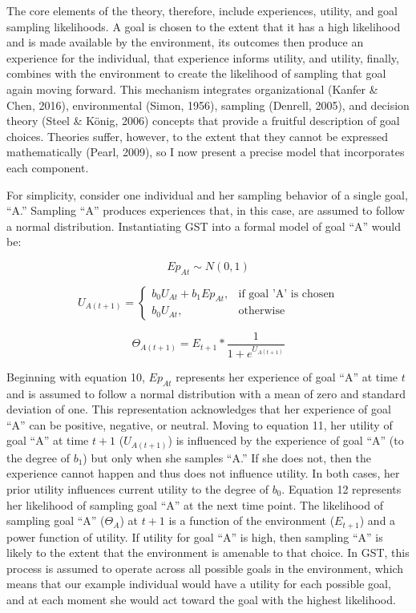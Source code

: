 \documentclass[english,man]{apa6}
\theoremstyle{definition}
\theoremstyle{definition}
\theoremstyle{definition}
\theoremstyle{remark}
\begin{document}
The core elements of the theory, therefore, include experiences,
utility, and goal sampling likelihoods. A goal is chosen to the extent
that it has a high likelihood and is made available by the environment,
its outcomes then produce an experience for the individual, that
experience informs utility, and utility, finally, combines with the
environment to create the likelihood of sampling that goal again moving
forward. This mechanism integrates organizational (Kanfer \& Chen,
2016), environmental (Simon, 1956), sampling (Denrell, 2005), and
decision theory (Steel \& König, 2006) concepts that provide a fruitful
description of goal choices. Theories suffer, however, to the extent
that they cannot be expressed mathematically (Pearl, 2009), so I now
present a precise model that incorporates each component.

For simplicity, consider one individual and her sampling behavior of a
single goal, \enquote{A.} Sampling \enquote{A} produces experiences
that, in this case, are assumed to follow a normal distribution.
Instantiating GST into a formal model of goal \enquote{A} would be:

\begin{equation}
Ep_{At} \sim {N}(0,1)
\end{equation}

\begin{equation}
U_{A(t+1)} = 
  \begin{cases}
  b_0 U_{At} + b_1 Ep_{At}, & \text{if goal 'A' is chosen}\\
  b_0 U_{At}, & \text{otherwise}
  \end{cases}
\end{equation}

\begin{equation}
\Theta_{A(t+1)} = E_{t+1} * {\frac {1}{1 + e^{U_{A(t+1)}}}}
\end{equation}

Beginning with equation 10, \(Ep_{At}\) represents her experience of
goal \enquote{A} at time \(t\) and is assumed to follow a normal
distribution with a mean of zero and standard deviation of one. This
representation acknowledges that her experience of goal \enquote{A} can
be positive, negative, or neutral. Moving to equation 11, her utility of
goal \enquote{A} at time \(t+1\) (\(U_{A(t+1)}\)) is influenced by the
experience of goal \enquote{A} (to the degree of \(b_1\)) but only when
she samples \enquote{A.} If she does not, then the experience cannot
happen and thus does not influence utility. In both cases, her prior
utility influences current utility to the degree of \(b_0\). Equation 12
represents her likelihood of sampling goal \enquote{A} at the next time
point. The likelihood of sampling goal \enquote{A} (\(\Theta_{A}\)) at
\(t+1\) is a function of the environment (\(E_{t+1}\)) and a power
function of utility. If utility for goal \enquote{A} is high, then
sampling \enquote{A} is likely to the extent that the environment is
amenable to that choice. In GST, this process is assumed to operate
across all possible goals in the environment, which means that our
example individual would have a utility for each possible goal, and at
each moment she would act toward the goal with the highest likelihood.
\end{document}
